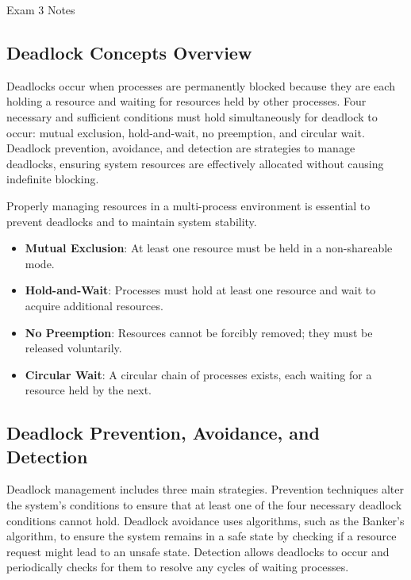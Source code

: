 \begin{examnotes}{Exam 3 Notes}
    \subsection*{Deadlock Concepts Overview}

    Deadlocks occur when processes are permanently blocked because they are each holding a resource and waiting for resources held by other processes. Four necessary and sufficient conditions must hold 
    simultaneously for deadlock to occur: mutual exclusion, hold-and-wait, no preemption, and circular wait. Deadlock prevention, avoidance, and detection are strategies to manage deadlocks, ensuring 
    system resources are effectively allocated without causing indefinite blocking.
    
    Properly managing resources in a multi-process environment is essential to prevent deadlocks and to maintain system stability.
    
    \begin{highlight}
        \begin{itemize}
            \item \textbf{Mutual Exclusion}: At least one resource must be held in a non-shareable mode.
            \item \textbf{Hold-and-Wait}: Processes must hold at least one resource and wait to acquire additional resources.
            \item \textbf{No Preemption}: Resources cannot be forcibly removed; they must be released voluntarily.
            \item \textbf{Circular Wait}: A circular chain of processes exists, each waiting for a resource held by the next.
        \end{itemize}
    \end{highlight}
    
    \subsection*{Deadlock Prevention, Avoidance, and Detection}
    
    Deadlock management includes three main strategies. Prevention techniques alter the system's conditions to ensure that at least one of the four necessary deadlock conditions cannot hold. Deadlock 
    avoidance uses algorithms, such as the Banker's algorithm, to ensure the system remains in a safe state by checking if a resource request might lead to an unsafe state. Detection allows deadlocks 
    to occur and periodically checks for them to resolve any cycles of waiting processes.
    

\end{examnotes}
